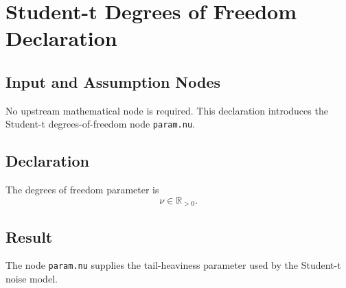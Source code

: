 \section{Student-t Degrees of Freedom Declaration}
\label{def:nu}

\subsection{Input and Assumption Nodes}
No upstream mathematical node is required. This declaration introduces the Student-t degrees-of-freedom node \texttt{param.nu}.

\subsection{Declaration}
The degrees of freedom parameter is
\[
  \nu \in \mathbb{R}_{>0}.
\]

\subsection{Result}
The node \texttt{param.nu} supplies the tail-heaviness parameter used by the Student-t noise model.

